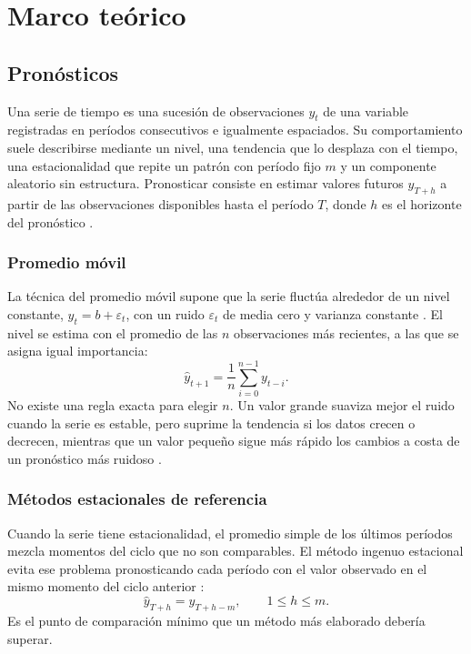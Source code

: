 \section{Marco teórico}
\subsection{Pronósticos}
\label{sec:marco-pronosticos}

Una serie de tiempo es una sucesión de observaciones $y_t$ de una variable registradas en períodos consecutivos e igualmente espaciados.
Su comportamiento suele describirse mediante un nivel, una tendencia que lo desplaza con el tiempo, una estacionalidad que repite un patrón con período fijo $m$ y un componente aleatorio sin estructura.
Pronosticar consiste en estimar valores futuros $\hat{y}_{T+h}$ a partir de las observaciones disponibles hasta el período $T$, donde $h$ es el horizonte del pronóstico \cite{hyndman_athanasopoulos_fpp3}.

\subsubsection{Promedio móvil}
La técnica del promedio móvil supone que la serie fluctúa alrededor de un nivel constante, $y_t = b + \varepsilon_t$, con un ruido $\varepsilon_t$ de media cero y varianza constante \cite{taha_io_2004}.
El nivel se estima con el promedio de las $n$ observaciones más recientes, a las que se asigna igual importancia:
\begin{equation}
  \hat{y}_{t+1} = \frac{1}{n} \sum_{i=0}^{n-1} y_{t-i}.
\end{equation}
No existe una regla exacta para elegir $n$.
Un valor grande suaviza mejor el ruido cuando la serie es estable, pero suprime la tendencia si los datos crecen o decrecen, mientras que un valor pequeño sigue más rápido los cambios a costa de un pronóstico más ruidoso \cite{taha_io_2004}.

\subsubsection{Métodos estacionales de referencia}
Cuando la serie tiene estacionalidad, el promedio simple de los últimos períodos mezcla momentos del ciclo que no son comparables.
El método ingenuo estacional evita ese problema pronosticando cada período con el valor observado en el mismo momento del ciclo anterior \cite{hyndman_athanasopoulos_fpp3}:
\begin{equation}
  \hat{y}_{T+h} = y_{T+h-m}, \qquad 1 \le h \le m.
\end{equation}
Es el punto de comparación mínimo que un método más elaborado debería superar.

